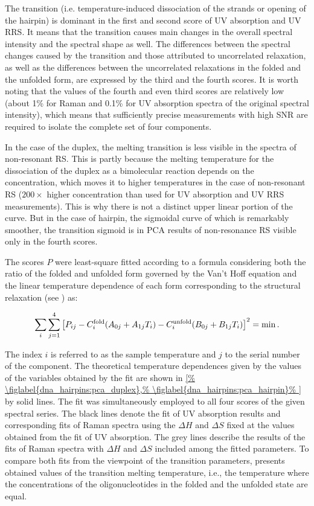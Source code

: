 The transition (i.e. temperature-induced dissociation of the strands or opening
of the hairpin) is dominant in the first and second score of UV absorption and
UV RRS.
It means that the transition causes main changes in the overall spectral
intensity and the spectral shape as well.
The differences between the spectral changes caused by the transition and those
attributed to uncorrelated relaxation, as well as the differences between the
uncorrelated relaxations in the folded and the unfolded form, are expressed by
the third and the fourth scores.
It is worth noting that the values of the fourth and even third scores are
relatively low (about 1\% for Raman and 0.1\% for UV absorption spectra of the
original spectral intensity), which means that sufficiently precise
measurements with high SNR are required to isolate the complete set of
four components.

In the case of the duplex, the melting transition is less visible in the
spectra of non-resonant RS.
This is partly because the melting temperature for the dissociation of the
duplex as a bimolecular reaction depends on the concentration, which moves it
to higher temperatures in the case of non-resonant RS ($200\times$ higher
concentration than used for UV absorption and UV RRS measurements).
This is why there is not a distinct upper linear portion of the curve.
But in the case of hairpin, the sigmoidal curve of which is remarkably
smoother, the transition sigmoid is in PCA results of non-resonance RS visible
only in the fourth scores.

The scores $P$ were least-square fitted according to a formula considering both
the ratio of the folded and unfolded form governed by the Van’t Hoff equation
and the linear temperature dependence of each form corresponding to the
structural relaxation (see
)
as:

\begin{equation*}
	\sum_i\sum_{j=1}^4\left[
		P_{ij} - C_i^\text{fold}(A_{0j} + A_{1j}T_i)
		- C_i^\text{unfold}(B_{0j} + B_{1j}T_i)
	\right]^2 = \operatorname{min}.
\end{equation*}

The index $i$ is referred to as the sample temperature and $j$ to the serial
number of the component.
The theoretical temperature dependences given by the values of the variables
obtained by the fit are shown in
\cref{%
	\figlabel{dna_hairpins:pca_duplex},%
	\figlabel{dna_hairpins:pca_hairpin}%
}
by solid lines.
The fit was simultaneously employed to all four scores of the given spectral
series.
The black lines denote the fit of UV absorption results and corresponding fits
of Raman spectra using the $\Delta{}H$ and $\Delta{}S$ fixed at the values
obtained from the fit of UV absorption.
The grey lines describe the results of the fits of Raman spectra with
$\Delta{}H$ and $\Delta{}S$ included among the fitted parameters.
To compare both fits from the viewpoint of the transition parameters,
presents obtained values of the transition melting temperature, i.e., the
temperature where the concentrations of the oligonucleotides in the folded and
the unfolded state are equal.

